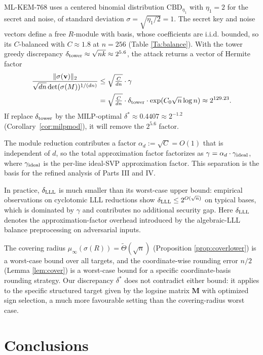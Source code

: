 \documentclass[11pt,a4paper]{article}
\theoremstyle{plain}
\theoremstyle{definition}
\theoremstyle{remark}
\begin{document}
ML-KEM-768 uses a centered binomial distribution $\mathrm{CBD}_{\eta_1}$ with $\eta_1=2$ for the secret and noise, of standard deviation $\sigma=\sqrt{\eta_1/2}=1$. The secret key and noise vectors define a free $R$-module with basis, whose coefficients are i.i.d. bounded, so its $C$-balanced with $C\approx 1.8$ at $n=256$ (Table \ref{Ta:balance}). With the tower greedy discrepancy $\delta_{\rm tower}\approx\sqrt{nk}\approx 2^{5.6}$, the attack returns a vector of Hermite factor
\begin{align}
  \frac{\|\sigma(\mathbf{v})\|_2}{\sqrt{dn}\det(\sigma(M))^{1/(dn)}}
  &\le \sqrt{\tfrac{C}{dn}}\cdot\gamma
  \notag
  \\
  &= \sqrt{\tfrac{C}{dn}}\cdot\delta_{\rm tower}\cdot
     \exp(C_0\sqrt n\log n)\approx 2^{129.23}.
\end{align}
If replace $\delta_{\rm tower}$ by the MILP-optimal $\delta^*\approx 0.4407\approx 2^{-1.2}$ (Corollary~\ref{cor:milpmod}), it will remove the $2^{5.6}$ factor. 

The module reduction contributes a factor $\alpha_d:=\sqrt{C}=O(1)$ that is independent of $d$, so the total approximation factor factorizes as $\gamma=\alpha_d\cdot\gamma_{\rm ideal}$, where $\gamma_{\rm ideal}$ is the per-line ideal-SVP approximation factor. This separation is the basis for the refined analysis of Parts III and IV.

In practice, $\delta_{\rm LLL}$ is much smaller than its worst-case upper bound: empirical observations on cyclotomic LLL reductions \cite{LLPS19,KEF20} show $\delta_{\rm LLL}\le 2^{O(\sqrt n)}$ on typical bases, which is dominated by $\gamma$ and contributes no additional security gap. Here $\delta_{\rm LLL}$ denotes the approximation-factor overhead introduced by the algebraic-LLL balance preprocessing \cite{LLPS19,KEF20} on adversarial inputs.

The covering radius $\mu_\infty(\sigma(R))=\tilde\Theta(\sqrt n)$ (Proposition \ref{prop:coverlower}) is a worst-case bound over all targets, and the coordinate-wise rounding error $n/2$ (Lemma \ref{lem:cover}) is a worst-case bound for a specific coordinate-basis rounding strategy. Our discrepancy $\delta^*$ does not contradict either bound: it applies to the specific structured target given by the logsine matrix $\mathbf{M}$ with optimized sign selection, a much more favourable setting than the covering-radius worst case.

\section{Conclusions}\label{sec:conclusion}
\end{document}
